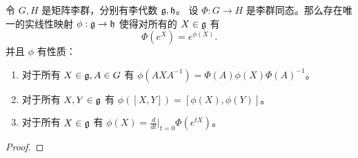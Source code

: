 \begin{theorem}
  令 $G,H$ 是矩阵李群，分别有李代数 $\mathfrak{g},\mathfrak{h}$。
  设 $\Phi:G\to H$ 是李群同态。那么存在唯一的实线性映射 $\phi:\mathfrak{g}\to\mathfrak{h}$
  使得对所有的 $X\in\mathfrak{g}$ 有
  \[
    \Phi(e^X)=e^{\phi(X)}.
  \]
  并且 $\phi$ 有性质：
  \begin{enumerate}
    \item 对于所有 $X\in\mathfrak{g},A\in G$ 有
    $\phi(AXA^{-1})=\Phi(A)\phi(X)\Phi(A)^{-1}$。
    \item 对于所有 $X,Y\in\mathfrak{g}$ 有 $\phi([X,Y])=[\phi(X),\phi(Y)]$。
    \item 对于所有 $X\in\mathfrak{g}$ 有 $\phi(X)=\frac{d}{dt}\big|_{t=0}\Phi(e^{tX})$。
  \end{enumerate}
\end{theorem}
\begin{proof}
  
\end{proof}

